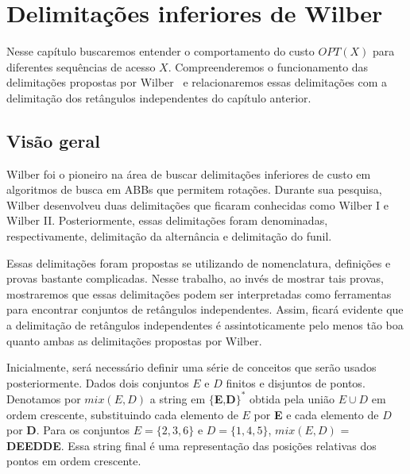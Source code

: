 
\chapter{Delimitações inferiores de Wilber}
\label{cap:wilber}

\newcommand{\cT}{\mathcal{T}}

Nesse capítulo buscaremos entender o comportamento do custo $OPT(X)$ para diferentes sequências de acesso $X$. Compreenderemos o funcionamento das delimitações propostas por Wilber~\cite{lowerbound_wilber} e relacionaremos essas delimitações com a delimitação dos retângulos independentes do capítulo anterior.

\section{Visão geral}

Wilber foi o pioneiro na área de buscar delimitações inferiores de custo em algoritmos de busca em ABBs que permitem rotações. Durante sua pesquisa, Wilber desenvolveu duas delimitações que ficaram conhecidas como Wilber I e Wilber II. Posteriormente, essas delimitações foram denominadas, respectivamente, delimitação da alternância e delimitação do funil. 

Essas delimitações foram propostas se utilizando de nomenclatura, definições e provas bastante complicadas. Nesse trabalho, ao invés de mostrar tais provas, mostraremos que essas delimitações podem ser interpretadas como ferramentas para encontrar conjuntos de retângulos independentes. Assim, ficará evidente que a delimitação de retângulos independentes é assintoticamente pelo menos tão boa quanto ambas as delimitações propostas por Wilber.

Inicialmente, será necessário definir uma série de conceitos que serão usados posteriormente.
Dados dois conjuntos $E$ e $D$ finitos e disjuntos de pontos. Denotamos por $mix(E,D)$ a string em $\{$\textbf{E},\textbf{D}$\}^{*}$ obtida pela união $E \cup D$ em ordem crescente, substituindo cada elemento de $E$ por \textbf{E} e cada elemento de $D$ por \textbf{D}. Para os conjuntos $E = \{2,3,6\}$ e $D = \{1,4,5\}$, $mix(E,D)$ = \textbf{DEEDDE}. Essa string final é uma representação das posições relativas dos pontos em ordem crescente.

